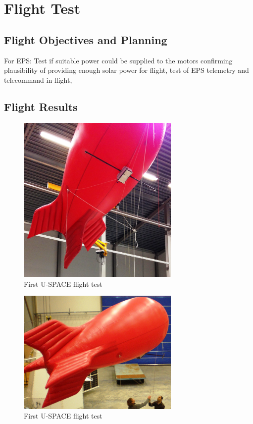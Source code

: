 \newpage
\chapter{Flight Test}
\label{chap:flight_test}

\section{Flight Objectives and Planning}

For EPS: Test if suitable power could be supplied to the motors confirming plausibility of providing enough solar power for flight, test of EPS telemetry and telecommand in-flight,  

\section{Flight Results}



\begin{figure}[H]
\centering
\includegraphics[width=0.7\textwidth]{figures/fig_FlightTest1_1}
\caption{First U-SPACE flight test}
\label{fig:FlightTest1_1}
\end{figure}

\begin{figure}[H]
\centering
\includegraphics[width=0.7\textwidth]{figures/fig_FlightTest1_2}
\caption{First U-SPACE flight test}
\label{fig:FlightTest1_2}
\end{figure}


